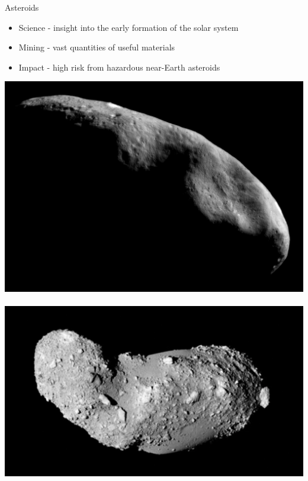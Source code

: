 \begin{frame}{Asteroids}
\begin{itemize}
    \item Science - insight into the early formation of the solar system
    \item Mining - vast quantities of useful materials
    \item Impact - high risk from hazardous near-Earth asteroids
\end{itemize}    

\begin{center}
    \includegraphics[height=0.5\textheight]{figures/2016AAS/near_mos_20001203_full.jpg}
    ~
    \includegraphics[height=0.5\textheight]{figures/2016AAS/Itokawa8_hayabusa_1210.jpg}
\end{center}
\end{frame}

